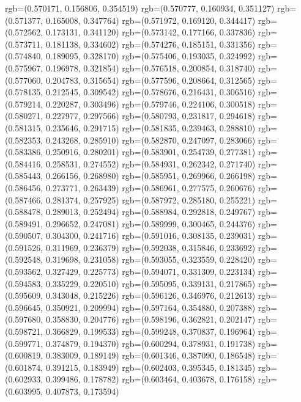 {{{					rgb=(0.570171, 0.156806, 0.354519)
					rgb=(0.570777, 0.160934, 0.351127)
					rgb=(0.571377, 0.165008, 0.347764)
					rgb=(0.571972, 0.169120, 0.344417)
					rgb=(0.572562, 0.173131, 0.341120)
					rgb=(0.573142, 0.177166, 0.337836)
					rgb=(0.573711, 0.181138, 0.334602)
					rgb=(0.574276, 0.185151, 0.331356)
					rgb=(0.574840, 0.189095, 0.328170)
					rgb=(0.575406, 0.193035, 0.324992)
					rgb=(0.575967, 0.196978, 0.321854)
					rgb=(0.576518, 0.200854, 0.318740)
					rgb=(0.577060, 0.204783, 0.315654)
					rgb=(0.577596, 0.208664, 0.312565)
					rgb=(0.578135, 0.212545, 0.309542)
					rgb=(0.578676, 0.216431, 0.306516)
					rgb=(0.579214, 0.220287, 0.303496)
					rgb=(0.579746, 0.224106, 0.300518)
					rgb=(0.580271, 0.227977, 0.297566)
					rgb=(0.580793, 0.231817, 0.294618)
					rgb=(0.581315, 0.235646, 0.291715)
					rgb=(0.581835, 0.239463, 0.288810)
					rgb=(0.582353, 0.243268, 0.285910)
					rgb=(0.582870, 0.247097, 0.283066)
					rgb=(0.583386, 0.250916, 0.280201)
					rgb=(0.583901, 0.254739, 0.277381)
					rgb=(0.584416, 0.258531, 0.274552)
					rgb=(0.584931, 0.262342, 0.271740)
					rgb=(0.585443, 0.266156, 0.268980)
					rgb=(0.585951, 0.269966, 0.266198)
					rgb=(0.586456, 0.273771, 0.263439)
					rgb=(0.586961, 0.277575, 0.260676)
					rgb=(0.587466, 0.281374, 0.257925)
					rgb=(0.587972, 0.285180, 0.255221)
					rgb=(0.588478, 0.289013, 0.252494)
					rgb=(0.588984, 0.292818, 0.249767)
					rgb=(0.589491, 0.296652, 0.247081)
					rgb=(0.589999, 0.300465, 0.244376)
					rgb=(0.590507, 0.304300, 0.241716)
					rgb=(0.591016, 0.308135, 0.239031)
					rgb=(0.591526, 0.311969, 0.236379)
					rgb=(0.592038, 0.315846, 0.233692)
					rgb=(0.592548, 0.319698, 0.231058)
					rgb=(0.593055, 0.323559, 0.228420)
					rgb=(0.593562, 0.327429, 0.225773)
					rgb=(0.594071, 0.331309, 0.223134)
					rgb=(0.594583, 0.335229, 0.220510)
					rgb=(0.595095, 0.339131, 0.217865)
					rgb=(0.595609, 0.343048, 0.215226)
					rgb=(0.596126, 0.346976, 0.212613)
					rgb=(0.596645, 0.350921, 0.209994)
					rgb=(0.597164, 0.354880, 0.207388)
					rgb=(0.597680, 0.358830, 0.204776)
					rgb=(0.598196, 0.362821, 0.202147)
					rgb=(0.598721, 0.366829, 0.199533)
					rgb=(0.599248, 0.370837, 0.196964)
					rgb=(0.599771, 0.374879, 0.194370)
					rgb=(0.600294, 0.378931, 0.191738)
					rgb=(0.600819, 0.383009, 0.189149)
					rgb=(0.601346, 0.387090, 0.186548)
					rgb=(0.601874, 0.391215, 0.183949)
					rgb=(0.602403, 0.395345, 0.181345)
					rgb=(0.602933, 0.399486, 0.178782)
					rgb=(0.603464, 0.403678, 0.176158)
					rgb=(0.603995, 0.407873, 0.173594)
}}}

